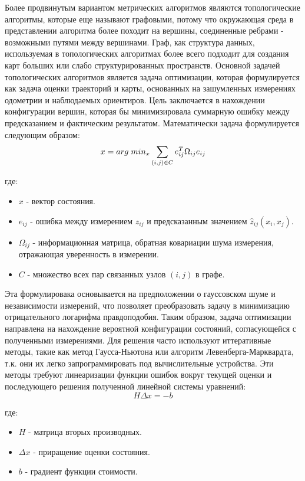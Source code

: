 \documentclass[a4paper, 14pt]{extreport}
\begin{document}
\par Более продвинутым вариантом метрических алгоритмов являются топологические алгоритмы\cite{slamArt2}, которые еще называют графовыми,
потому что окружающая среда в представлении алгоритма более походит на вершины, соединенные ребрами - возможными путями между вершинами.
Граф, как структура данных, используемая в топологических алгоритмах более всего подходит для создания карт больших или слабо
структурированных пространств. Основной задачей топологических алгоритмов является задача оптимизации\cite{slamArt3}, которая формулируется как задача
оценки траекторий и карты, основанных на зашумленных измерениях одометрии и наблюдаемых ориентиров. Цель заключается в нахождении 
конфигурации вершин, которая бы минимизировала суммарную ошибку между предсказанием и фактическим результатом. Математически задача 
формулируется следующим образом:
\[
   x = arg \hspace{1mm} min_{x} \sum_{(i,j) \in C} e_{ij}^T \Omega_{ij} e_{ij}
\]
\par\noindent где:
\begin{itemize}
        \item \(x\) - вектор состояния.
        \item \(e_{ij}\) - ошибка между измерением \(z_{ij}\) и предсказанным значением \(\hat{z}_{ij}(x_i, x_j)\).
        \item \(\Omega_{ij}\) - информационная матрица, обратная ковариации шума измерения, отражающая уверенность в измерении.
        \item \(C\) - множество всех пар связанных узлов \((i,j)\) в графе.
\end{itemize}
\par\noindent Эта формулировака основывается на предположении о гауссовском шуме и независимости измерений, что позволяет преобразовать задачу в 
минимизацию отрицательного логарифма правдоподобия. Таким образом, задача оптимизации направлена на нахождение вероятной конфигурации 
состояний, согласующейся с полученными измерениями. Для решения часто используют иттеративные методы, такие как метод Гаусса-Ньютона или 
алгоритм Левенберга-Марквардта, т.к. они их легко запрограммировать под вычислительные устройства. Эти методы требуют линеаризации функции 
ошибок вокруг текущей оценки и последующего решения полученной линейной системы уравнений:
\[
   H \Delta x = -b
\]
\par\noindent где:
\begin{itemize}
        \item \(H\) - матрица вторых производных.
        \item \(\Delta x\) - приращение оценки состояния.
        \item \(b\) - градиент функции стоимости.
\end{itemize}
\end{document}
